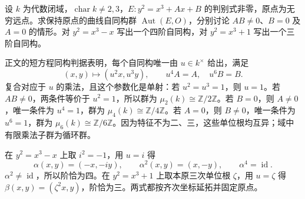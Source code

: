 \begin{exercise}\label{b3:ex:H-elliptic-automorphisms}
	设 \(k\) 为代数闭域，\(\operatorname{char}k\ne2,3\)，\(E:y^2=x^3+Ax+B\) 的判别式非零，原点为无穷远点。求保持原点的曲线自同构群 \(\operatorname{Aut}(E,O)\)，分别讨论 \(AB\ne0\)、\(B=0\) 及 \(A=0\) 的情形。对 \(y^2=x^3-x\) 写出一个四阶自同构，对 \(y^2=x^3+1\) 写出一个三阶自同构。
\end{exercise}
\begin{solution}
	正文的短方程同构判据表明，每个自同构唯一由 \(u\in k^\times\) 给出，满足
	\[
		(x,y)\longmapsto(u^2x,u^3y),\qquad
		u^4A=A,\quad u^6B=B.
	\]
	复合对应于 \(u\) 的乘法，且这个参数化是单射：若 \(u^2=u^3=1\)，则 \(u=1\)。若 \(AB\ne0\)，两条件等价于 \(u^2=1\)，所以群为 \(\mu_2(k)\cong\mathbb Z/2\mathbb Z\)。若 \(B=0\)，则 \(A\ne0\)，唯一条件为 \(u^4=1\)，群为 \(\mu_4(k)\cong\mathbb Z/4\mathbb Z\)。若 \(A=0\)，则 \(B\ne0\)，唯一条件为 \(u^6=1\)，群为 \(\mu_6(k)\cong\mathbb Z/6\mathbb Z\)。因为特征不为二、三，这些单位根均互异；域中有限乘法子群为循环群。

	在 \(y^2=x^3-x\) 上取 \(i^2=-1\)，用 \(u=i\) 得
	\[
		\alpha(x,y)=(-x,-iy),\qquad
		\alpha^2(x,y)=(x,-y),\qquad \alpha^4=\operatorname{id}.
	\]
	\(\alpha^2\ne\operatorname{id}\)，所以阶恰为四。在 \(y^2=x^3+1\) 上取本原三次单位根 \(\zeta\)，用 \(u=\zeta\) 得 \(\beta(x,y)=(\zeta^2x,y)\)，阶恰为三。两式都按齐次坐标延拓并固定原点。
\end{solution}

